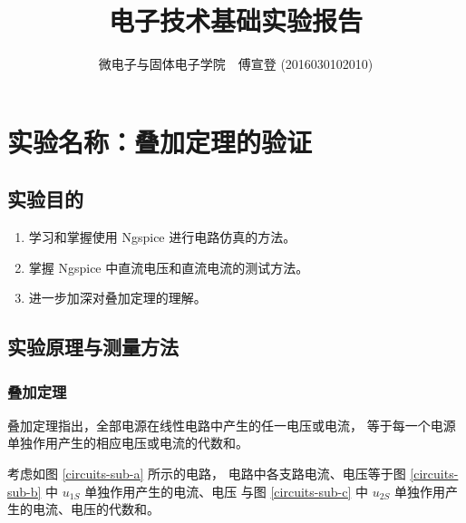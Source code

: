 \documentclass[UTF8,linespread=1.236]{ctexart}
\begin{document}
\title{电子技术基础实验报告}
\author{微电子与固体电子学院\ \ 傅宣登 (2016030102010)}

\maketitle

\section{实验名称：叠加定理的验证}

\subsection{实验目的}

\begin{enumerate}
    \item 学习和掌握使用 Ngspice 进行电路仿真的方法。
    \item 掌握 Ngspice 中直流电压和直流电流的测试方法。
    \item 进一步加深对叠加定理的理解。
\end{enumerate}

\subsection{实验原理与测量方法}

\subsubsection{叠加定理}

叠加定理指出，全部电源在线性电路中产生的任一电压或电流，
等于每一个电源单独作用产生的相应电压或电流的代数和。

考虑如图 \ref{circuits-sub-a} 所示的电路，
电路中各支路电流、电压等于图 \ref{circuits-sub-b} 中 $u_{1S}$ 单独作用产生的电流、电压
与图 \ref{circuits-sub-c} 中 $u_{2S}$ 单独作用产生的电流、电压的代数和。
\end{document}
